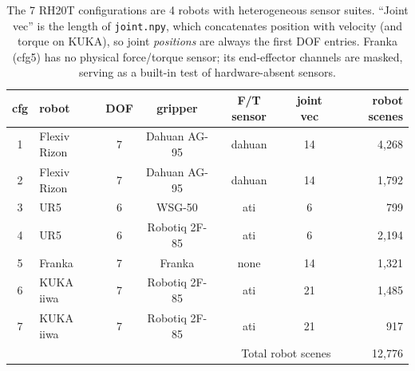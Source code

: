 \documentclass{article}
\begin{document}
\begin{table}[!htbp]
  \centering
  \caption{The 7 RH20T configurations are 4 robots with heterogeneous sensor
  suites. ``Joint vec'' is the length of \texttt{joint.npy}, which concatenates position with velocity (and torque on KUKA), so joint \emph{positions} are always the first DOF entries. Franka (cfg5) has no physical force/torque sensor; its end-effector channels are masked, serving as a built-in test of hardware-absent sensors.}
  \label{tab:cfgs}
  \begin{tabular}{clccccr}
    \toprule
    cfg & robot & DOF & gripper & F/T sensor & joint vec & robot scenes \\
    \midrule
    1 & Flexiv Rizon & 7 & Dahuan AG-95 & dahuan & 14 & 4{,}268 \\
    2 & Flexiv Rizon & 7 & Dahuan AG-95 & dahuan & 14 & 1{,}792 \\
    3 & UR5          & 6 & WSG-50       & ati    & 6  & 799   \\
    4 & UR5          & 6 & Robotiq 2F-85& ati    & 6  & 2{,}194 \\
    5 & Franka       & 7 & Franka       & none   & 14 & 1{,}321 \\
    6 & KUKA iiwa    & 7 & Robotiq 2F-85& ati    & 21 & 1{,}485 \\
    7 & KUKA iiwa    & 7 & Robotiq 2F-85& ati    & 21 & 917   \\
    \midrule
    \multicolumn{6}{r}{Total robot scenes} & 12{,}776 \\
    \bottomrule
  \end{tabular}
\end{table}
\end{document}
